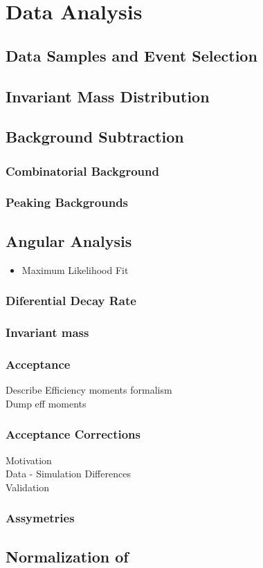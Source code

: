 
\chapter{Data Analysis}
\label{Data_Analysis}


\section{Data Samples and Event Selection}


\section{\BJpsiKpi Invariant Mass Distribution}

\section{Background Subtraction}
\subsection{Combinatorial Background}
\subsection{Peaking Backgrounds}

\section{Angular Analysis}
\begin{itemize}
  \item Maximum Likelihood Fit
\end{itemize}

\subsection{Diferential Decay Rate}
\subsection{\Kpi Invariant mass}
\subsection{Acceptance}

Describe Efficiency moments formalism\\
Dump eff moments\\

\subsection{Acceptance Corrections}
Motivation\\
Data - Simulation Differences\\
Validation\\

\subsection{\CP Assymetries}

\section{Normalization of \BsJpsiKpi}
